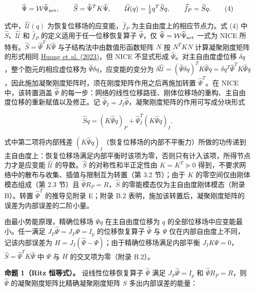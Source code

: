 \documentclass[preprint,12pt,authoryear]{elsarticle}
\begin{document}
\[
\widehat\Psi=\mathcal W\widehat\Psi_{\rm net},\qquad
\widehat S=\widehat\Psi^TK\widehat\Psi,\qquad
\widehat{\mathcal U}(q)=\tfrac12q^T\widehat S q,\qquad
\widehat f_P=\widehat S q.
\tag{4}
\]

式中，\(\widehat{\mathcal U}(q)\) 为恢复位移场的应变能，\(\widehat f_P\) 为主自由度上的相应节点力。式 (4) 中 \(\widehat S\)、\(\widehat{\mathcal U}\) 和 \(\widehat f_P\) 的定义适用于任一位移恢复算子 \(\widehat\Psi\)，仅 \(\widehat\Psi=\mathcal W\widehat\Psi_{\rm net}\) 一式为 NICE 所特有。\(\widehat S=\widehat\Psi^TK\widehat\Psi\) 与子结构法中由数值形函数矩阵 \(N\) 按 \(N^TKN\) 计算凝聚刚度矩阵的形式相同 \href{https://doi.org/10.1016/j.eml.2023.102041}{Huang et al. (2023)}，但 NICE 不显式形成 \(\widehat\Psi\)。对主自由度虚位移 \(\delta q\)，整个胞元的相应虚位移为 \(\widehat\Psi\delta q\)，应变能的变分为 \(\delta\widehat{\mathcal U}=(\widehat\Psi\delta q)^TK\widehat\Psi q=\delta q^T\widehat\Psi^TK\widehat\Psi q\)，因此施加凝聚刚度矩阵时，须在刚度矩阵作用之后再施加转置 \(\widehat\Psi^T\)。在 NICE 中，该转置涵盖 \(\widehat\Psi\) 的每一步：网络的线性位移路径、刚体位移场的重构、主自由度位移的重新赋值以及修正。记 \(\widehat\Psi_I=J_I\widehat\Psi\)，凝聚刚度矩阵的作用可写成分块形式

\[
\widehat S q=(K\widehat\Psi q)_P+\widehat\Psi_I^T(K\widehat\Psi q)_I.
\tag{5}
\]

式中第二项将内部残差 \((K\widehat\Psi q)_I\)（恢复位移场的内部不平衡力）所做的功传递到主自由度上：恢复位移场满足内部平衡时该项为零，否则只有计入该项，所得节点力才是应变能 \(\widehat{\mathcal U}\) 的导数。\(\widehat S\) 的对称性和半正定性由 \(K=K^T\succeq0\) 得到，不要求网络中的散布与收集、插值与限制互为转置（第 3.2 节）；由于 \(K\) 的零空间仅由刚体模态组成（第 2.3 节）且 \(\widehat\Psi R_P=R\)，\(\widehat S\) 的零能模态仅为主自由度刚体模态（附录 B）。转置 \(\widehat\Psi^T\) 的推导见附录 E；附录 B.2 表明，施加该转置后，凝聚刚度矩阵的误差为内部误差的二阶小量。

由最小势能原理，精确位移场 \(\Psi q\) 在主自由度位移为 \(q\) 的全部位移场中应变能最小。任一满足 \(J_P\widehat\Psi=J_P\Psi=I_p\) 的位移恢复算子 \(\widehat\Psi\) 与 \(\Psi\) 仅在内部自由度上不同，记该内部误差为 \(H=J_I(\widehat\Psi-\Psi)\)；由于精确位移场满足内部平衡 \(J_IK\Psi=0\)，\(\widehat S=\widehat\Psi^TK\widehat\Psi\) 中 \(\Psi\) 与 \(H\) 的交叉项为零（附录 B.2）。

\textbf{命题 1（Ritz 恒等式）。} 设线性位移恢复算子 \(\widehat\Psi\) 满足 \(J_P\widehat\Psi=I_p\) 和 \(\widehat\Psi R_P=R\)，则 \(\widehat\Psi\) 的凝聚刚度矩阵比精确凝聚刚度矩阵 \(S\) 多出内部误差的能量：
\end{document}
